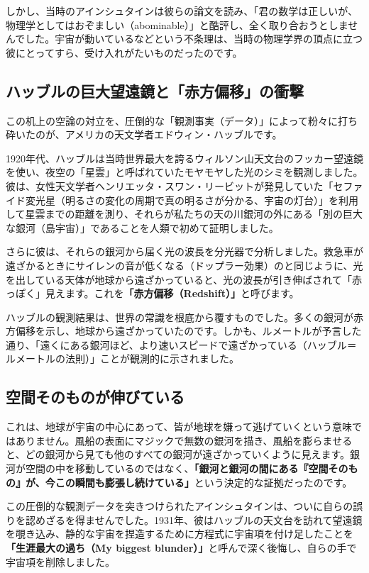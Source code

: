 しかし、当時のアインシュタインは彼らの論文を読み、「君の数学は正しいが、物理学としてはおぞましい（abominable）」と酷評し、全く取り合おうとしませんでした。宇宙が動いているなどという不条理は、当時の物理学界の頂点に立つ彼にとってすら、受け入れがたいものだったのです。

\subsection{ハッブルの巨大望遠鏡と「赤方偏移」の衝撃}

この机上の空論の対立を、圧倒的な「観測事実（データ）」によって粉々に打ち砕いたのが、アメリカの天文学者エドウィン・ハッブルです。

1920年代、ハッブルは当時世界最大を誇るウィルソン山天文台のフッカー望遠鏡を使い、夜空の「星雲」と呼ばれていたモヤモヤした光のシミを観測しました。彼は、女性天文学者ヘンリエッタ・スワン・リービットが発見していた「セファイド変光星（明るさの変化の周期で真の明るさが分かる、宇宙の灯台）」を利用して星雲までの距離を測り、それらが私たちの天の川銀河の外にある「別の巨大な銀河（島宇宙）」であることを人類で初めて証明しました。

さらに彼は、それらの銀河から届く光の波長を分光器で分析しました。救急車が遠ざかるときにサイレンの音が低くなる（ドップラー効果）のと同じように、光を出している天体が地球から遠ざかっていると、光の波長が引き伸ばされて「赤っぽく」見えます。これを\textbf{「赤方偏移（Redshift）」}と呼びます。

ハッブルの観測結果は、世界の常識を根底から覆すものでした。多くの銀河が赤方偏移を示し、地球から遠ざかっていたのです。しかも、ルメートルが予言した通り、「遠くにある銀河ほど、より速いスピードで遠ざかっている（ハッブル＝ルメートルの法則）」ことが観測的に示されました。

\subsection{空間そのものが伸びている}

これは、地球が宇宙の中心にあって、皆が地球を嫌って逃げていくという意味ではありません。風船の表面にマジックで無数の銀河を描き、風船を膨らませると、どの銀河から見ても他のすべての銀河が遠ざかっていくように見えます。銀河が空間の中を移動しているのではなく、\textbf{「銀河と銀河の間にある『空間そのもの』が、今この瞬間も膨張し続けている」}という決定的な証拠だったのです。

この圧倒的な観測データを突きつけられたアインシュタインは、ついに自らの誤りを認めざるを得ませんでした。1931年、彼はハッブルの天文台を訪れて望遠鏡を覗き込み、静的な宇宙を捏造するために方程式に宇宙項を付け足したことを\textbf{「生涯最大の過ち（My biggest blunder）」}と呼んで深く後悔し、自らの手で宇宙項を削除しました。

